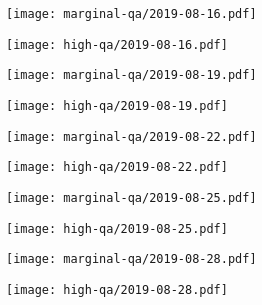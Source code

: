 \documentclass{article}
\begin{document}
\begin{figure}[H]
	\ContinuedFloat
	\centering
	\begin{subfigure}{0.48\linewidth}
		\texttt{[image: marginal-qa/2019-08-16.pdf]}
	\end{subfigure}
	\begin{subfigure}{0.48\linewidth}
		\texttt{[image: high-qa/2019-08-16.pdf]}
	\end{subfigure}
	\begin{subfigure}{0.48\linewidth}
		\texttt{[image: marginal-qa/2019-08-19.pdf]}
	\end{subfigure}
	\begin{subfigure}{0.48\linewidth}
		\texttt{[image: high-qa/2019-08-19.pdf]}
	\end{subfigure}
	\begin{subfigure}{0.48\linewidth}
		\texttt{[image: marginal-qa/2019-08-22.pdf]}
	\end{subfigure}
	\begin{subfigure}{0.48\linewidth}
		\texttt{[image: high-qa/2019-08-22.pdf]}
	\end{subfigure}
	\begin{subfigure}{0.48\linewidth}
		\texttt{[image: marginal-qa/2019-08-25.pdf]}
	\end{subfigure}
	\begin{subfigure}{0.48\linewidth}
		\texttt{[image: high-qa/2019-08-25.pdf]}
	\end{subfigure}
	\begin{subfigure}{0.48\linewidth}
		\texttt{[image: marginal-qa/2019-08-28.pdf]}
	\end{subfigure}
	\begin{subfigure}{0.48\linewidth}
		\texttt{[image: high-qa/2019-08-28.pdf]}
	\end{subfigure}
\end{figure}
\end{document}
